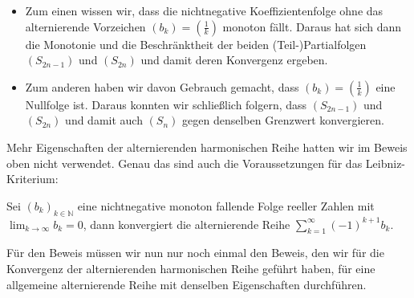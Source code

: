 \documentclass[fontsize=9pt,
               parskip=half-,
               DIV=14,
               listof=chapterentry,
               tocflat]{scrbook}
\begin{document}
\begin{itemize}
\item Zum einen wissen wir, dass die nichtnegative Koeffizientenfolge ohne das alternierende Vorzeichen $(b_{k})=\left({\frac {1}{k}}\right)$ monoton fällt. Daraus hat sich dann die Monotonie und die Beschränktheit der beiden (Teil-)Partialfolgen $(S_{2n-1})$ und $(S_{2n})$ und damit deren Konvergenz ergeben.
\item Zum anderen haben wir davon Gebrauch gemacht, dass $(b_{k})=\left({\frac {1}{k}}\right)$ eine Nullfolge ist. Daraus konnten wir schließlich folgern, dass $(S_{2n-1})$ und $(S_{2n})$ und damit auch $(S_{n})$ gegen denselben Grenzwert konvergieren.
\end{itemize}

Mehr Eigenschaften der alternierenden harmonischen Reihe hatten wir im Beweis oben nicht verwendet. Genau das sind auch die Voraussetzungen für das Leibniz-Kriterium:

\begin{theorem*}
Sei $(b_{k})_{k\in \mathbb {N} }$ eine nichtnegative monoton fallende Folge reeller Zahlen mit $\lim _{k\to \infty }b_{k}=0$, dann konvergiert die alternierende Reihe $\sum _{k=1}^{\infty }(-1)^{k+1}b_{k}$.

\end{theorem*}

\begin{explanation*}
Für den Beweis müssen wir nun nur noch einmal den Beweis, den wir für die Konvergenz der alternierenden harmonischen Reihe geführt haben, für eine allgemeine alternierende Reihe mit denselben Eigenschaften durchführen.

\end{explanation*}
\end{document}
